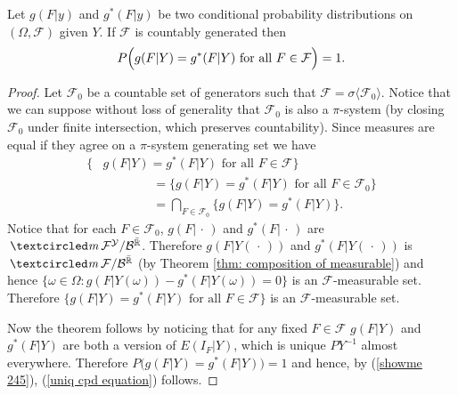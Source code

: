 \begin{theorem}
 Let $g(F|y)$ and $g^*(F|y)$ be two conditional probability distributions on $(\Omega, \mathcal F)$ given $Y$.
If $\mathcal F$ is countably generated then
\begin{equation}
\label{uniq cpd equation}
P\Bigl(\text{$g(F |Y) = g^*(F | Y)$ for all $F\in\mathcal F$}\Bigr) = 1.
\end{equation}
\end{theorem}
\begin{proof}
Let $\mathcal F_0$ be  a countable set of generators such that $\mathcal F = \sigma\langle\mathcal F_0\rangle$. Notice that we can suppose without loss of generality that $\mathcal F_0$ is also a $\pi$-system (by closing $\mathcal F_0$ under finite intersection, which preserves countability). Since measures are equal if they agree on a $\pi$-system generating set we have
\begin{align}
\bigl\{&\text{$g(F |Y) = g^*(F | Y)$ for all $F\in\mathcal F$}\bigr\}\nonumber \\
&\qquad\qquad=\bigl\{ \text{$g(F |Y) = g^*(F | Y)$ for all $F\in\mathcal F_0$} \bigr\}\nonumber \\
&\qquad\qquad=\bigcap_{F\in\mathcal F_0}\{ g(F |Y) = g^*(F | Y) \}. \label{showme 245}
\end{align}
Notice that for each $F\in\mathcal F_0$, $g(F|\,\cdot\,)$ and $g^*(F|\,\cdot\,)$ are $\mcirc \mathcal F^{\mathcal Y}/\mathcal B^{\bar{\Bbb R}}$.
Therefore $g(F|Y(\,\cdot\,))$ and $g^*(F|Y(\,\cdot\,))$ is $\mcirc \mathcal F/\mathcal B^{\bar{\Bbb R}}$ (by Theorem \ref{thm: composition of measurable}) and hence $\{\omega\in\Omega \colon  g(F |Y(\omega)) - g^*(F | Y(\omega))=0\}$ is an $\mathcal F$-measurable set. Therefore  $\{\text{$g(F |Y) = g^*(F | Y)$ for all $F\in\mathcal F$}\}$ is an $\mathcal F$-measurable set.

Now the theorem follows by noticing that for any fixed $F\in\mathcal F$ $g(F|Y)$ and $g^*(F|Y)$ are both a version of $E(I_F|Y)$, which is unique $PY^{-1}$ almost everywhere. Therefore $P\bigl(g(F |Y) = g^*(F | Y) \bigr)=1$ and hence, by (\ref{showme 245}), (\ref{uniq cpd equation}) follows.
\end{proof}



